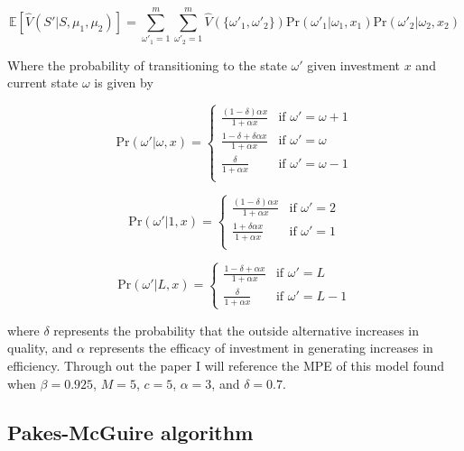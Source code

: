 \documentclass[12pt]{article}
\begin{document}
\begin{equation*}
  \mathbb{E}[\hat{V}(S'|S,\mu_{1},\mu_{2})] = \sum_{\omega'_1=1}^m \sum_{\omega'_2=1}^m \hat{V}(\{\omega'_1,\omega'_2\}) \text{Pr}(\omega'_1|\omega_1,x_{1}) \text{Pr}(\omega'_2|\omega_2,x_{2})
\end{equation*}

Where the probability of transitioning to the state $\omega'$ given investment $x$ and current state $\omega$ is given by

\begin{equation*}
  \text{Pr}(\omega'|\omega,x) =
  \begin{cases}
    \frac{(1-\delta) \alpha x}{1+\alpha x} & \text{if } \omega'=\omega+1\\
    \frac{1-\delta+\delta \alpha x}{1+\alpha x} & \text{if } \omega' = \omega\\
    \frac{\delta}{1+\alpha x} & \text{if } \omega' = \omega-1\\
  \end{cases}
\end{equation*}

\begin{equation*}
  \text{Pr}(\omega'|1,x) =
  \begin{cases}
    \frac{(1-\delta) \alpha x}{1+\alpha x} & \text{if } \omega'=2\\
    \frac{1+\delta \alpha x}{1+\alpha x} & \text{if } \omega'=1\\
  \end{cases}
\end{equation*}

\begin{equation*}
  \text{Pr}(\omega'|L,x) =
  \begin{cases}
    \frac{1-\delta+\alpha x}{1+\alpha x} & \text{if } \omega'=L\\
    \frac{\delta}{1+\alpha x} & \text{if } \omega'=L-1
  \end{cases}
\end{equation*}

where $\delta$ represents the probability that the outside alternative increases in quality, and $\alpha$ represents the efficacy of investment in generating increases in efficiency. Through out the paper I will reference the MPE of this model found when $\beta=0.925$, $M=5$, $c=5$, $\alpha=3$, and $\delta=0.7$.

\subsection{Pakes-McGuire algorithm}
\end{document}
